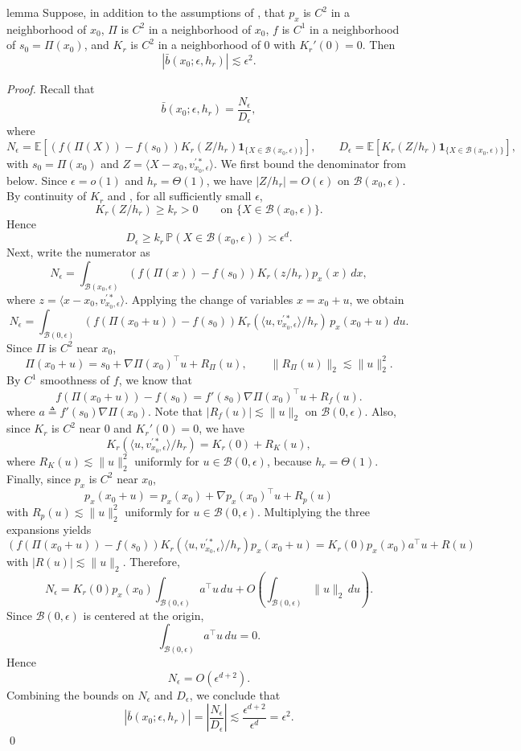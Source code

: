 \documentclass[11pt]{article}
\begin{document}
\begin{restatable}{lemma}{}\label{lemma: bias bound}
    Suppose, in addition to the assumptions of , that
    \(p_x\) is \(C^2\) in a neighborhood of \(x_0\), \(\Pi\) is \(C^2\) in a neighborhood of
    \(x_0\), \(f\) is $C^1$ in a neighborhood of \(s_0 = \Pi(x_0)\), and \(K_r\) is \(C^2\)
    in a neighborhood of \(0\) with \(K_r'(0)=0\). Then
    \[
        |\bar b(x_0;\epsilon,h_r)| \lesssim \epsilon^2.
    \]
\end{restatable}
\noindent \textit{Proof.}
Recall that
\[
\bar b(x_0;\epsilon,h_r)
=
\frac{N_\epsilon}{D_\epsilon},
\]
where
\[
N_\epsilon
=
\mathbb E\!\left[(f(\Pi(X))-f(s_0))K_r(Z/h_r)\mathbf 1_{\{X\in \mathcal B(x_0,\epsilon)\}}\right],
\qquad
D_\epsilon
=
\mathbb E\!\left[K_r(Z/h_r)\mathbf 1_{\{X\in \mathcal B(x_0,\epsilon)\}}\right],
\]
with \(s_0=\Pi(x_0)\) and \(Z=\langle X-x_0,v_{x_0,\epsilon}^{\prime *}\rangle\). We first bound the denominator from below. Since \(\epsilon=o(1)\) and \(h_r=\Theta(1)\), we have
\(|Z/h_r|=O(\epsilon)\) on \(\mathcal B(x_0,\epsilon)\). By continuity of \(K_r\) and
, for all sufficiently small \(\epsilon\),
\[
K_r(Z/h_r)\ge k_r>0
\qquad\text{on }\{X\in \mathcal B(x_0,\epsilon)\}.
\]
Hence
\[
D_\epsilon
\ge
k_r\,\mathbb P(X\in \mathcal B(x_0,\epsilon))
\asymp \epsilon^d.
\]
Next, write the numerator as
\[
N_\epsilon
=
\int_{\mathcal B(x_0,\epsilon)}
(f(\Pi(x))-f(s_0))K_r(z/h_r)p_x(x)\,dx,
\]
where \(z=\langle x-x_0,v_{x_0,\epsilon}^{\prime *}\rangle\). Applying the change of variables
\(x=x_0+u\), we obtain
\[
N_\epsilon
=
\int_{\mathcal B(0,\epsilon)}
(f(\Pi(x_0+u))-f(s_0))
K_r(\langle u,v_{x_0,\epsilon}^{\prime *}\rangle/h_r)\,
p_x(x_0+u)\,du.
\]
Since \(\Pi\) is \(C^2\) near \(x_0\),
\[
\Pi(x_0+u)
=
s_0 + \nabla\Pi(x_0)^\top u + R_\Pi(u),
\qquad
\|R_\Pi(u)\|_2 \lesssim \|u\|_2^2.
\]
By $C^1$ smoothness of \(f\), we know that 
\[
f(\Pi(x_0+u)) - f(s_0) =  f'(s_0)\nabla\Pi(x_0)^\top u + R_f(u).
\]
where $a \triangleq f'(s_0)\nabla\Pi(x_0).$  Note that $|R_f(u)|\lesssim \|u\|_2$ on $\mathcal{B}(0, \epsilon)$. Also, since \(K_r\) is \(C^2\) near \(0\) and \(K_r'(0)=0\), we have
\[
K_r(\langle u,v_{x_0,\epsilon}^{\prime *}\rangle/h_r)
=
K_r(0)+R_K(u),
\]
where $R_K(u) \lesssim \|u\|_2^2$ uniformly for \(u\in \mathcal B(0,\epsilon)\), because \(h_r=\Theta(1)\). Finally, since \(p_x\)
is \(C^2\) near \(x_0\),
\[
p_x(x_0+u)=p_x(x_0)+\nabla p_x(x_0)^\top u + R_p(u)
\]
with $R_p(u) \lesssim \|u\|_2^2$ uniformly for \(u\in \mathcal B(0,\epsilon)\). Multiplying the three expansions yields
\[
(f(\Pi(x_0+u))-f(s_0))
K_r(\langle u,v_{x_0,\epsilon}^{\prime *}\rangle/h_r)
p_x(x_0+u)
=
K_r(0)p_x(x_0)a^\top u + R(u)
\]
with $|R(u)| \lesssim \|u\|_2$. Therefore,
\[
N_\epsilon
=
K_r(0)p_x(x_0)\int_{\mathcal B(0,\epsilon)} a^\top u\,du
+
O\!\left(\int_{\mathcal B(0,\epsilon)} \|u\|_2\,du\right).
\]
Since \(\mathcal B(0,\epsilon)\) is centered at the origin,
\[
\int_{\mathcal B(0,\epsilon)} a^\top u\,du = 0.
\]
Hence
\[
N_\epsilon
=
O(\epsilon^{d+2}).
\]
Combining the bounds on \(N_\epsilon\) and \(D_\epsilon\), we conclude that
\[
|\bar b(x_0;\epsilon,h_r)|
=
\left|\frac{N_\epsilon}{D_\epsilon}\right|
\lesssim
\frac{\epsilon^{d+2}}{\epsilon^d}
=
\epsilon^2.
\]
\qed
\end{document}
